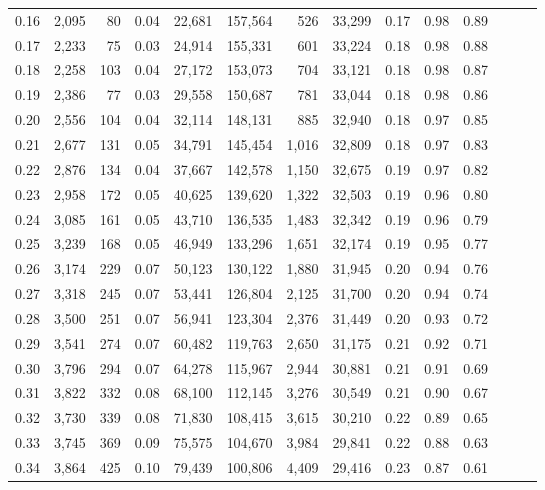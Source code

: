 \begin{tabular}{rrrrrrrrrrrrrr}
0.16 &  2,095 &   80 &  0.04 &   22,681 &  157,564 &     526 &  33,299 &  0.17 &  0.98 &      0.89 \\
0.17 &  2,233 &   75 &  0.03 &   24,914 &  155,331 &     601 &  33,224 &  0.18 &  0.98 &      0.88 \\
0.18 &  2,258 &  103 &  0.04 &   27,172 &  153,073 &     704 &  33,121 &  0.18 &  0.98 &      0.87 \\
0.19 &  2,386 &   77 &  0.03 &   29,558 &  150,687 &     781 &  33,044 &  0.18 &  0.98 &      0.86 \\
0.20 &  2,556 &  104 &  0.04 &   32,114 &  148,131 &     885 &  32,940 &  0.18 &  0.97 &      0.85 \\
0.21 &  2,677 &  131 &  0.05 &   34,791 &  145,454 &   1,016 &  32,809 &  0.18 &  0.97 &      0.83 \\
0.22 &  2,876 &  134 &  0.04 &   37,667 &  142,578 &   1,150 &  32,675 &  0.19 &  0.97 &      0.82 \\
0.23 &  2,958 &  172 &  0.05 &   40,625 &  139,620 &   1,322 &  32,503 &  0.19 &  0.96 &      0.80 \\
0.24 &  3,085 &  161 &  0.05 &   43,710 &  136,535 &   1,483 &  32,342 &  0.19 &  0.96 &      0.79 \\
0.25 &  3,239 &  168 &  0.05 &   46,949 &  133,296 &   1,651 &  32,174 &  0.19 &  0.95 &      0.77 \\
0.26 &  3,174 &  229 &  0.07 &   50,123 &  130,122 &   1,880 &  31,945 &  0.20 &  0.94 &      0.76 \\
0.27 &  3,318 &  245 &  0.07 &   53,441 &  126,804 &   2,125 &  31,700 &  0.20 &  0.94 &      0.74 \\
0.28 &  3,500 &  251 &  0.07 &   56,941 &  123,304 &   2,376 &  31,449 &  0.20 &  0.93 &      0.72 \\
0.29 &  3,541 &  274 &  0.07 &   60,482 &  119,763 &   2,650 &  31,175 &  0.21 &  0.92 &      0.71 \\
0.30 &  3,796 &  294 &  0.07 &   64,278 &  115,967 &   2,944 &  30,881 &  0.21 &  0.91 &      0.69 \\
0.31 &  3,822 &  332 &  0.08 &   68,100 &  112,145 &   3,276 &  30,549 &  0.21 &  0.90 &      0.67 \\
0.32 &  3,730 &  339 &  0.08 &   71,830 &  108,415 &   3,615 &  30,210 &  0.22 &  0.89 &      0.65 \\
0.33 &  3,745 &  369 &  0.09 &   75,575 &  104,670 &   3,984 &  29,841 &  0.22 &  0.88 &      0.63 \\
0.34 &  3,864 &  425 &  0.10 &   79,439 &  100,806 &   4,409 &  29,416 &  0.23 &  0.87 &      0.61 \\

\end{tabular}
